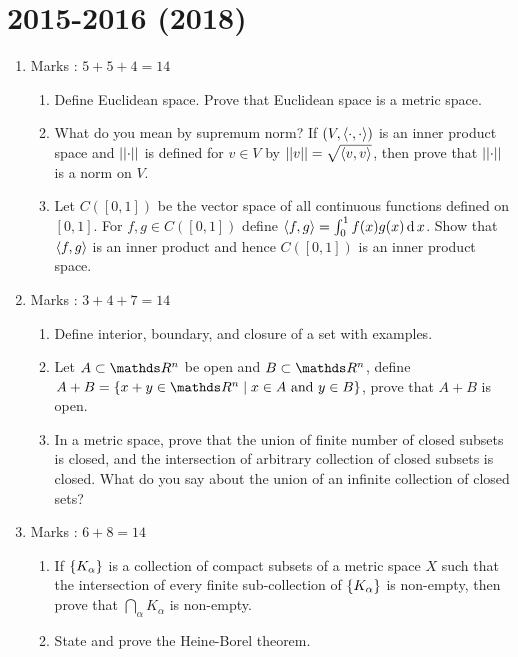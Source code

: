 \documentclass[../main-sheet.tex]{subfiles}
\begin{document}
\section*{2015-2016 (2018)}
\begin{enumerate}
    \item Marks : $ 5+5+4=14 $
          \begin{enumerate}
              \item Define Euclidean space. Prove that Euclidean space is a metric space.
              \item What do you mean by supremum norm? If $ (V,\left<\cdot,\cdot\right>) $ is an inner product space and $ \left\vert\left\vert\cdot\right\vert\right\vert $ is defined for $ v \in V $ by $ \left\vert\left\vert v\right\vert\right\vert=\sqrt{\left<v,v\right>} $, then prove that $ \left\vert\left\vert\cdot\right\vert\right\vert $ is a norm on $ V $.
              \item Let $ C([0, 1]) $ be the vector space of all continuous functions defined on $ [0,1] $. For $ f,g \in C([0,1]) $ define $ \left<f,g\right>= \int_0^1 f(x) g(x)\,\mathrm{d}\, x $. Show that $ \left<f, g \right> $ is an inner product and hence $ C([0, 1]) $ is an inner product space.
        \end{enumerate}\newpage
        \item Marks : $ 3+4+7=14 $
        \begin{enumerate}
            \item Define interior, boundary, and closure of a set with examples.
            \item Let $ A \subset \R^n  $ be open and $ B\subset  \R^n $, define $ A+B =\set{x+y\in\R^n\mid x \in A \text{ and } y \in B} $, prove that $ A + B $ is open.
            \item In a metric space, prove that the union of finite number of closed subsets is closed, and the intersection of arbitrary collection of closed subsets is closed. What do you say about the union of an infinite collection of closed sets?
        \end{enumerate}
        \item Marks : $ 6+8=14 $
        \begin{enumerate}
              \item If $ \left\{K_\alpha\right\} $ is a collection of compact subsets of a metric space $ X $ such that the intersection of every finite sub-collection of $ \left\{K_\alpha\right\} $ is non-empty, then prove that $ \bigcap_\alpha K_\alpha $ is non-empty.
              \item State and prove the Heine-Borel theorem.
        \end{enumerate}

\end{enumerate}
\end{document}
